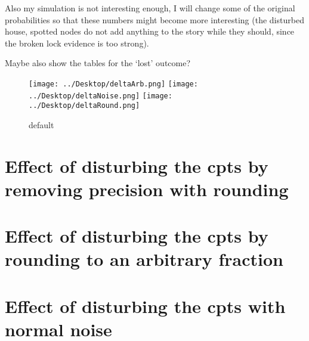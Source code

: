 \documentclass[11pt]{amsart}
\begin{document}
Also my simulation is not interesting enough, I will change some of the original probabilities so that these numbers might become more interesting (the disturbed house, spotted nodes do not add anything to the story while they should, since the broken lock evidence is too strong).

Maybe also show the tables for the `lost' outcome?
\begin{figure}[htbp]
\begin{center}
\texttt{[image: ../Desktop/deltaArb.png]}
\texttt{[image: ../Desktop/deltaNoise.png]}
\texttt{[image: ../Desktop/deltaRound.png]}
\caption{default}
\label{default}
\end{center}
\end{figure}


\clearpage

\section{Effect of disturbing the cpts by removing precision with rounding}
\let\oldcentering\centering
\renewcommand\centering{\tiny\oldcentering}

\clearpage
\section{Effect of disturbing the cpts by rounding to an arbitrary fraction}

\clearpage
\section{Effect of disturbing the cpts with normal noise}

\clearpage
\end{document}
